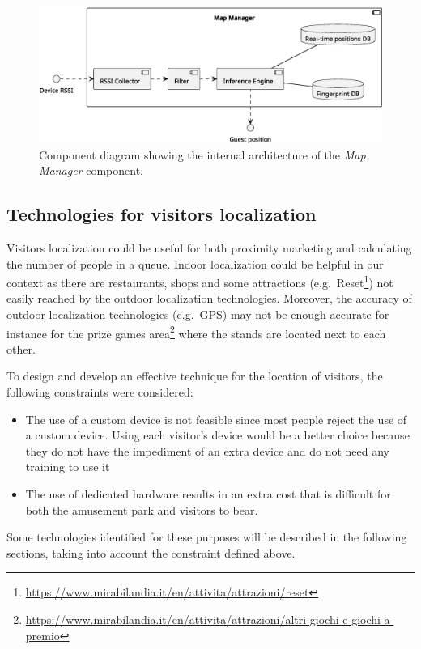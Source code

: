 \begin{figure}[H]
	\centering
	\includegraphics[width=\textwidth]{img/map-manager.eps}
	\caption{Component diagram showing the internal architecture of the \textit{Map Manager} component.
	}
	\label{fig:map-manager}
\end{figure}

\subsection{Technologies for visitors localization}\label{sec:technologies}
Visitors localization could be useful for both proximity marketing and calculating the number of people in a queue.
Indoor localization could be helpful in our context as there are restaurants, shops and some attractions
(e.g.\ Reset\footnote{\url{https://www.mirabilandia.it/en/attivita/attrazioni/reset}}) not easily reached by the outdoor localization technologies.
Moreover, the accuracy of outdoor localization technologies (e.g.\ GPS) may not be enough accurate for instance for the prize games area\footnote{\url{https://www.mirabilandia.it/en/attivita/attrazioni/altri-giochi-e-giochi-a-premio}}
where the stands are located next to each other.

To design and develop an effective technique for the location of visitors, the following constraints were considered:
\begin{itemize}
	\item The use of a custom device is not feasible since most people reject the use of a custom device. Using each visitor's device would
	      be a better choice because they do not have the impediment of an extra device and do not need any training to use it
	\item The use of dedicated hardware results in an extra cost that is difficult for both the amusement park and visitors to bear.
\end{itemize}

Some technologies identified for these purposes will be described in the following sections, taking into account the constraint defined above.

